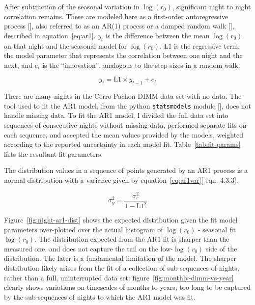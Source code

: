 \documentclass[DM,authoryear,toc]{lsstdoc}
\begin{document}
After subtraction of the seasonal variation in $\log(r_0)$,
significant night to night correlation remains. These are modeled here as a
first-order autoregressive process [\cite{cryer_time_2008}], also
referred to as an AR(1) process or a damped random walk
[\cite{2009ApJ...698..895K}], described in
equation~\ref{eq:ar1}. $y_t$ is the difference between the mean
$\log(r_0)$ on that night and the seasonal model for
$\log(r_0)$. $\mbox{L1}$ is the regressive term, the model parameter
that represents the correlation between one night and the next, and
$e_t$ is the ``innovation'', analogous to the step sizes in a random
walk.

\begin{equation} \label{eq:ar1}
y_t = \mbox{L1} \times y_{t-1} + e_t
\end{equation}

There are many nights in the Cerro Pachon DIMM data set with no data.
The tool used to fit the AR1 model, from the python
\texttt{statsmodels} module [\cite{seabold2010statsmodels}], does not
handle missing data. To fit the AR1 model, I divided the full data set
into sequences of consecutive nights without missing data, performed
separate fits on each sequence, and accepted the mean values provided
by the models, weighted according to the reported uncertainty in each
model fit. Table~\ref{tab:fit-params} lists the resultant fit
parameters.

The distribution values in a sequence of points generated by an AR1
process is a normal distribution with a variance given by
equation~\ref{eq:ar1var}[\cite{cryer_time_2008} eqn. 4.3.3].

\begin{equation} \label{eq:ar1var}
\sigma_y^2 = \frac{\sigma_e^2}{1-\mbox{L1}^2}
\end{equation}

Figure~\ref{fig:night-ar1-dist} shows the expected distribution given
the fit model parameters over-plotted over the actual histogram of
$\log(r_0)$ - seasonal fit $\log(r_0)$. The distribution expected from
the AR1 fit is sharper than the measured one, and does not capture the
tail on the low-$\log(r_0)$ side of the distribution. The later is a
fundamental limitation of the model. The sharper distribution likely
arises from the fit of a collection of sub-sequences of nights, rather
than a full, uninterrupted data set:
figure~\ref{fig:monthly-dimm-vs-year} clearly shows variations on
timescales of months to years, too long to be captured by the
sub-sequences of nights to which the AR1 model was fit.
\end{document}
